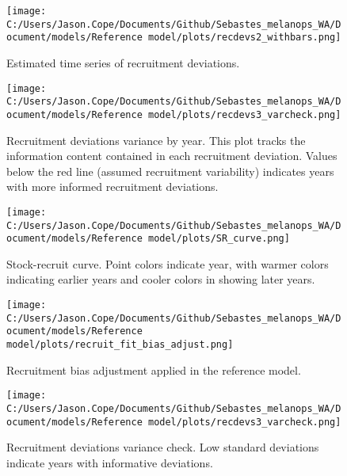 \documentclass[11pt,
  english,
  letterpaper,
]{article}
\begin{document}
\pagebreak

\begin{figure}
\centering
\texttt{[image: C:/Users/Jason.Cope/Documents/Github/Sebastes\_melanops\_WA/Document/models/Reference model/plots/recdevs2\_withbars.png]}
\caption{Estimated time series of recruitment deviations.\label{fig:rec-devs}}
\end{figure}

\pagebreak

\begin{figure}
\centering
\texttt{[image: C:/Users/Jason.Cope/Documents/Github/Sebastes\_melanops\_WA/Document/models/Reference model/plots/recdevs3\_varcheck.png]}
\caption{Recruitment deviations variance by year. This plot tracks the information content contained in each recruitment deviation. Values below the red line (assumed recruitment variability) indicates years with more informed recruitment deviations.\label{fig:rec-devs-sigmas}}
\end{figure}

\pagebreak

\begin{figure}
\centering
\texttt{[image: C:/Users/Jason.Cope/Documents/Github/Sebastes\_melanops\_WA/Document/models/Reference model/plots/SR\_curve.png]}
\caption{Stock-recruit curve. Point colors indicate year, with warmer colors indicating earlier years and cooler colors in showing later years.\label{fig:bh-curve}}
\end{figure}

\pagebreak

\begin{figure}
\centering
\texttt{[image: C:/Users/Jason.Cope/Documents/Github/Sebastes\_melanops\_WA/Document/models/Reference model/plots/recruit\_fit\_bias\_adjust.png]}
\caption{Recruitment bias adjustment applied in the reference model.\label{fig:bias-adj}}
\end{figure}

\begin{figure}
\centering
\texttt{[image: C:/Users/Jason.Cope/Documents/Github/Sebastes\_melanops\_WA/Document/models/Reference model/plots/recdevs3\_varcheck.png]}
\caption{Recruitment deviations variance check. Low standard deviations indicate years with informative deviations.\label{fig:varcheck}}
\end{figure}
\end{document}
